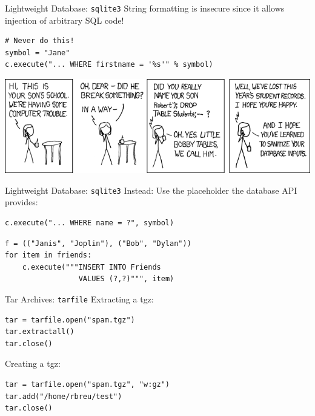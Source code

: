 \begin{frame}[fragile]{Lightweight Database: \texttt{sqlite3}}
String formatting is insecure since it allows injection of arbitrary SQL code!
\begin{lstlisting}[style=Python]
# Never do this!
symbol = "Jane"
c.execute("... WHERE firstname = '%s'" % symbol)
\end{lstlisting}
\vspace{2mm}
\includegraphics[width=\textwidth]{images/exploits_of_a_mom.png}
\end{frame}

\begin{frame}[fragile]{Lightweight Database: \texttt{sqlite3}}
Instead: Use the placeholder the database API provides:
\begin{lstlisting}[style=Python]
c.execute("... WHERE name = ?", symbol)
\end{lstlisting}
\begin{lstlisting}[style=Python]
f = (("Janis", "Joplin"), ("Bob", "Dylan"))
for item in friends:
    c.execute("""INSERT INTO Friends 
                 VALUES (?,?)""", item)
\end{lstlisting}
\end{frame}

\begin{frame}[fragile]{Tar Archives: \texttt{tarfile}}
Extracting a tgz:
\begin{lstlisting}[style=Python]
tar = tarfile.open("spam.tgz")
tar.extractall()
tar.close()
\end{lstlisting}
\vspace*{3mm}
Creating a tgz:
\begin{lstlisting}[style=Python]
tar = tarfile.open("spam.tgz", "w:gz")
tar.add("/home/rbreu/test")
tar.close()
\end{lstlisting}
\end{frame}

